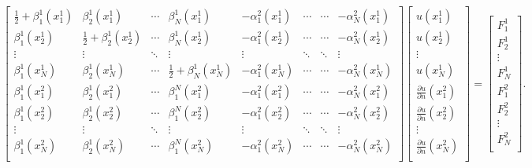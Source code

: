 \begin{eqnarray*}
\begin{bmatrix}
    \frac{1}{2}+\beta^1_1(x_1^1)& \beta^1_2(x_1^1)& \cdots &
    \beta^1_N(x_1^1)& -\alpha_1^2(x_1^1)& \cdots&\cdots&
    -\alpha_N^2(x_1^1) \\
    \beta^1_1(x_2^1)& \frac{1}{2}+\beta^1_2(x_2^1)& \cdots &
    \beta^1_N(x_2^1)& -\alpha_1^2(x_2^1)& \cdots&\cdots&
    -\alpha_N^2(x_2^1) \\
    \vdots& \vdots& \ddots& \vdots& \vdots& \ddots& \ddots& \vdots\\
    \beta^1_1(x_N^1)& \beta^1_2(x_N^1)& \cdots &
    \frac{1}{2} + \beta^1_N(x_N^1)& -\alpha_1^2(x_N^1)&
    \cdots&\cdots&
    -\alpha_N^2(x_N^1) \\
    \beta_1^1(x_1^2)& \beta_2^1(x_1^2)& \cdots& \beta_1^N(x_1^2)&
    -\alpha_1^2(x_1^2)& \cdots& \cdots& -\alpha_N^2(x_1^2)  \\
    \beta_1^1(x_2^2)& \beta_2^1(x_2^2)& \cdots& \beta_1^N(x_2^2)&
    -\alpha_1^2(x_2^2)& \cdots& \cdots& -\alpha_N^2(x_2^2)  \\
    \vdots& \vdots& \ddots& \vdots& \vdots& \ddots& \ddots& \vdots\\
    \beta_1^1(x_N^2)& \beta_2^1(x_N^2)& \cdots& \beta_1^N(x_N^2)&
    -\alpha_1^2(x_N^2)& \cdots& \cdots& -\alpha_N^2(x_N^2)  \\
\end{bmatrix}
\begin{bmatrix}
    u(x_1^1)    \\
    u(x_2^1)    \\
    \vdots      \\
    u(x_N^1)    \\
    \frac{\partial u}{\partial n}(x_1^2)    \\
    \frac{\partial u}{\partial n}(x_2^2)    \\
    \vdots      \\
    \frac{\partial u}{\partial n}(x_N^2)    \\
\end{bmatrix}
=
\begin{bmatrix}
    F_1^1   \\
    F_2^1   \\
    \vdots  \\
    F_N^1   \\
    F_1^2   \\
    F_2^2   \\
    \vdots  \\
    F_N^2   \\
\end{bmatrix}.
\end{eqnarray*}
